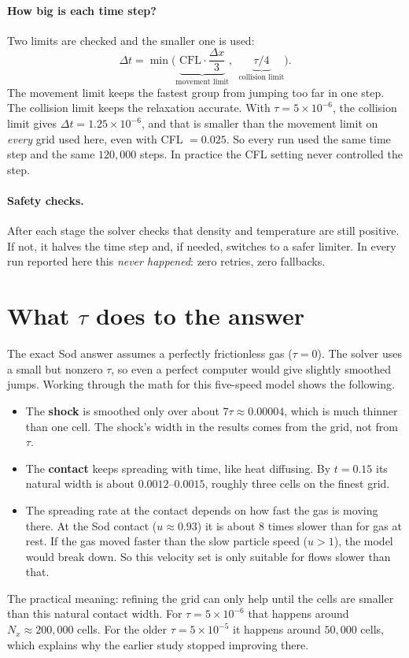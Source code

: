 \documentclass[11pt]{article}
\begin{document}
\paragraph{How big is each time step?}  Two limits are checked and the smaller one
is used:
\[
  \Delta t = \min\Big(\underbrace{\text{CFL}\cdot\frac{\Delta x}{3}}_{\text{movement limit}},\ \ \underbrace{\tau/4}_{\text{collision limit}}\Big).
\]
The movement limit keeps the fastest group from jumping too far in one step.  The
collision limit keeps the relaxation accurate.  With $\tau = 5\times10^{-6}$, the
collision limit gives $\Delta t = 1.25\times10^{-6}$, and that is smaller than the
movement limit on \emph{every} grid used here, even with CFL $= 0.025$.  So every run
used the same time step and the same $120{,}000$ steps.  In practice the CFL setting
never controlled the step.

\paragraph{Safety checks.}  After each stage the solver checks that density and
temperature are still positive.  If not, it halves the time step and, if needed,
switches to a safer limiter.  In every run reported here this \emph{never
happened}: zero retries, zero fallbacks.

\section{What $\tau$ does to the answer}

The exact Sod answer assumes a perfectly frictionless gas ($\tau = 0$).  The solver
uses a small but nonzero $\tau$, so even a perfect computer would give slightly
smoothed jumps.  Working through the math for this five-speed model shows the
following.
\begin{itemize}
  \item The \textbf{shock} is smoothed only over about $7\tau \approx 0.00004$,
        which is much thinner than one cell.  The shock's width in the results
        comes from the grid, not from $\tau$.
  \item The \textbf{contact} keeps spreading with time, like heat diffusing.  By
        $t = 0.15$ its natural width is about $0.0012$--$0.0015$, roughly three
        cells on the finest grid.
  \item The spreading rate at the contact depends on how fast the gas is moving
        there.  At the Sod contact ($u \approx 0.93$) it is about 8 times slower
        than for gas at rest.  If the gas moved faster than the slow particle
        speed ($u > 1$), the model would break down.  So this velocity set is only
        suitable for flows slower than that.
\end{itemize}
The practical meaning: refining the grid can only help until the cells are smaller
than this natural contact width.  For $\tau = 5\times10^{-6}$ that happens around
$N_x \approx 200{,}000$ cells.  For the older $\tau = 5\times10^{-5}$ it happens
around $50{,}000$ cells, which explains why the earlier study stopped improving
there.
\end{document}
